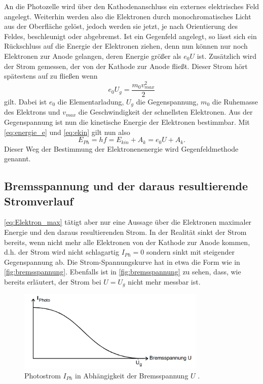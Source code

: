 An die Photozelle wird über den Kathodenanschluss ein externes elektrisches Feld angelegt. Weiterhin werden also die Elektronen durch monochromatisches Licht aus der Oberfläche gelöst, jedoch werden sie jetzt, je nach Orientierung des Feldes,
beschleunigt oder abgebremst. 
Ist ein Gegenfeld angelegt, so lässt sich ein Rückschluss auf die Energie der Elektronen ziehen, denn nun können nur noch Elektronen zur Anode gelangen, deren Energie größer
als $e_0 U$ ist. Zusätzlich wird der Strom gemessen, der von der Kathode zur Anode fließt.
Dieser Strom hört spätestens auf zu fließen wenn 
\begin{equation}\label{eq:ekin}
    e_0 U_g = \frac{m_0 v_{max}^2}{2} 
\end{equation}
gilt. Dabei ist $e_0$ die Elementarladung, $U_g$ die Gegenspannung, $m_0$ die Ruhemasse des Elektrons und $v_{max}$ die Geschwindigkeit der schnellsten Elektronen.
Aus der Gegenspannung ist nun die kinetische Energie der Elektronen bestimmbar. Mit \autoref{eq:energie_e} und \autoref{eq:ekin} gilt nun also
\begin{equation}\label{eq:Elektron_max}
    E_{Ph} = hf = E_{kin} + A_k = e_0 U + A_k.
\end{equation}
Dieser Weg der Bestimmung der Elektronenenergie wird Gegenfeldmethode genannt.

\subsection{Bremsspannung und der daraus resultierende Stromverlauf}
\autoref{eq:Elektron_max} tätigt aber nur eine Aussage über die Elektronen maximaler Energie und den daraus resultierenden 
Strom. In der Realität sinkt der Strom bereits, wenn nicht mehr alle Elektronen von der Kathode zur Anode kommen, d.h. der Strom wird nicht schlagartig $I_{Ph} = 0$ sondern
sinkt mit steigender Gegenspannung ab. Die Strom-Spannungskurve hat in etwa die Form wie in \autoref{fig:bremsspannung}. Ebenfalls ist in \autoref{fig:bremsspannung} zu sehen, dass, wie bereits erläutert, der Strom bei $U = U_g$ nicht mehr messbar ist.

\begin{figure}[H]
    \centering
    \includegraphics[width=0.8\textwidth]{img/bremsspannung.png}
    \caption{Photostrom $I_{Ph}$ in Abhängigkeit der Bremsspannung $U$ \cite{V500}.}
    \label{fig:bremsspannung}
\end{figure}

